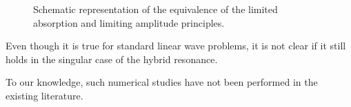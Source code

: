 \begin{figure}
 \caption{Schematic representation of the equivalence of the limited absorption and limiting amplitude principles.}
\label{fig:limits}
\end{figure}
Even though it is true for standard linear wave problems, it is not clear if it still holds in the singular case 
of the hybrid resonance.


To our knowledge, such numerical studies have not been performed in the existing literature. 
